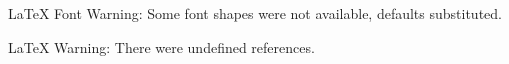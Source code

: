 
LaTeX Font Warning: Some font shapes were not available, defaults substituted.


LaTeX Warning: There were undefined references.

